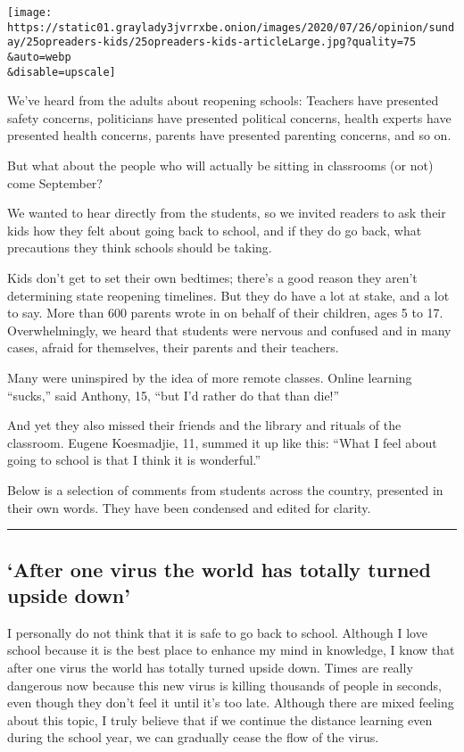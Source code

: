 \texttt{[image: https://static01.graylady3jvrrxbe.onion/images/2020/07/26/opinion/sunday/25opreaders-kids/25opreaders-kids-articleLarge.jpg?quality=75\\\&auto=webp\\\&disable=upscale]}

We've heard from the adults about reopening schools: Teachers have
presented safety concerns, politicians have presented political
concerns, health experts have presented health concerns, parents have
presented parenting concerns, and so on.

But what about the people who will actually be sitting in classrooms (or
not) come September?

We wanted to hear directly from the students, so we invited readers to
ask their kids how they felt about going back to school, and if they do
go back, what precautions they think schools should be taking.

Kids don't get to set their own bedtimes; there's a good reason they
aren't determining state reopening timelines. But they do have a lot at
stake, and a lot to say. More than 600 parents wrote in on behalf of
their children, ages 5 to 17. Overwhelmingly, we heard that students
were nervous and confused and in many cases, afraid for themselves,
their parents and their teachers.

Many were uninspired by the idea of more remote classes. Online learning
``sucks,'' said Anthony, 15, ``but I'd rather do that than die!''

And yet they also missed their friends and the library and rituals of
the classroom. Eugene Koesmadjie, 11, summed it up like this: ``What I
feel about going to school is that I think it is wonderful.''

Below is a selection of comments from students across the country,
presented in their own words. They have been condensed and edited for
clarity.

\begin{center}\rule{0.5\linewidth}{\linethickness}\end{center}

\hypertarget{after-one-virus-the-world-has-totally-turned-upside-down}{%
\subsection{`After one virus the world has totally turned upside
down'}\label{after-one-virus-the-world-has-totally-turned-upside-down}}

I personally do not think that it is safe to go back to school. Although
I love school because it is the best place to enhance my mind in
knowledge, I know that after one virus the world has totally turned
upside down. Times are really dangerous now because this new virus is
killing thousands of people in seconds, even though they don't feel it
until it's too late. Although there are mixed feeling about this topic,
I truly believe that if we continue the distance learning even during
the school year, we can gradually cease the flow of the virus.

